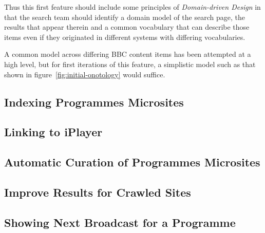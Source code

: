 Thus this first feature should include some principles of
\emph{Domain-driven Design}\cite{evans2004domain}
in that the search team should identify
a domain model of the search page, the results that appear therein
and a common vocabulary that can describe those items even if
they originated in different systems with differing vocabularies.

A common model across differing BBC content items has been
attempted\cite{fenning2014applicability} at a high level, but
for first iterations of this feature, a simplistic model
such as that shown in figure~\ref{fig:initial-onotology}
would suffice.

\subsection{Indexing Programmes Microsites}


\subsection{Linking to iPlayer}


\subsection{Automatic Curation of Programmes Microsites}


\subsection{Improve Results for Crawled Sites}


\subsection{Showing Next Broadcast for a Programme}

